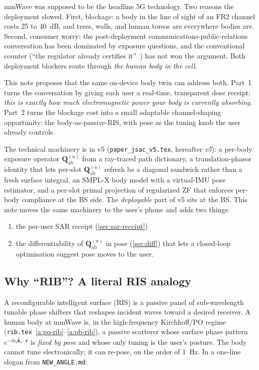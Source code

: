 \documentclass[11pt,a4paper]{article}
\theoremstyle{definition}
\newcommand{\rr}{\mathbf{r}}
\newcommand{\Qabs}{\mathbf{Q}_{\mathrm{ab}}}
\newcommand{\kout}{\hat{\bm{k}}_{\mathrm{o}}}
\begin{document}
mmWave was supposed to be the headline 5G technology.  Two reasons
the deployment slowed.  First, blockage: a body in the line of sight
of an FR2 channel costs \SI{25}{} to \SI{40}{dB}, and trees, walls,
and human torsos are everywhere bodies are.  Second, consumer worry:
the post-deployment communications-public-relations conversation
has been dominated by exposure questions, and the conventional
counter (``the regulator already certifies it''~\cite{ICNIRP2020})
has not won the argument.  Both deployment blockers route through
\emph{the human body in the cell}.

This note proposes that the same on-device body twin can address
both.  Part~1 turns the conversation by giving each user a
real-time, transparent dose receipt: \emph{this is exactly how much
electromagnetic power your body is currently absorbing.}  Part~2
turns the blockage cost into a small adaptable channel-shaping
opportunity: the body-as-passive-RIS, with pose as the tuning knob
the user already controls.

The technical machinery is in v5
(\texttt{paper\_jsac\_v5.tex}, hereafter \emph{v5}): a per-body
exposure operator $\Qabs^{(u)}$ from a ray-traced path dictionary,
a translation-phasor identity that lets per-slot $\Qabs^{(u)}$
refresh be a diagonal sandwich rather than a fresh surface
integral, an SMPL-X body model with a virtual-IMU pose estimator,
and a per-slot primal projection of regularized ZF that enforces
per-body compliance at the BS side.  The \emph{deployable} part of
v5 sits at the BS.  This note moves the same machinery to the
user's phone and adds two things:
\begin{enumerate}[leftmargin=1.6em,itemsep=2pt]
\item the per-user SAR receipt (\cref{sec:sar-receipt})
\item the differentiability of $\Qabs^{(u)}$ in pose (\cref{sec:diff})
that lets a closed-loop optimisation suggest pose moves to the user.
\end{enumerate}

\subsection{Why ``RIB''?  A literal RIS analogy}

A reconfigurable intelligent surface (RIS) is a passive panel of
sub-wavelength tunable phase shifters that reshapes incident waves
toward a desired receiver.  A human body at mmWave is, in the
high-frequency Kirchhoff/PO regime
(\texttt{rib.tex}~\cref{a:po-rib}--\cref{a:pb-rib}), a passive
scatterer whose surface phase pattern $e^{-ik_0\kout\cdot\rr}$ is
\emph{fixed by pose} and whose only tuning is the user's posture.
The body cannot tune electronically; it can re-pose, on the order of
\SI{1}{\Hz}.  In a one-line slogan from \texttt{NEW\_ANGLE.md}:
\end{document}
